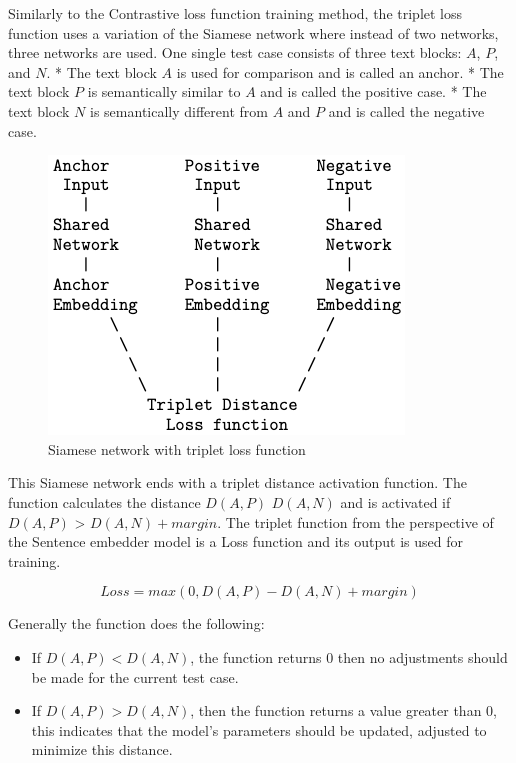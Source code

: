 \documentclass{wseas}
\begin{document}
Similarly to the Contrastive loss function training method, the triplet
loss function uses a variation of the Siamese network where instead of
two networks, three networks are used. One single test case consists of
three text blocks: \(A\), \(P\), and \(N\). * The text block \(A\) is
used for comparison and is called an anchor. * The text block \(P\) is
semantically similar to \(A\) and is called the positive case. * The
text block \(N\) is semantically different from \(A\) and \(P\) and is
called the negative case.


\begin{figure}[htbp]
  \centering
  \includegraphics[width=\linewidth]{resources/v1/tripletLoss.png}
  \caption{Siamese network with triplet loss function}
  \label{fig:triplet_loss_function_figure}
\end{figure}

This Siamese network ends with a triplet distance activation function.
The function calculates the distance \(D(A,P)\) \(D(A,N)\) and is
activated if \(D(A,P)\) \textgreater{} \(D(A,N) + margin\). The
triplet function from the perspective of the Sentence embedder model is
a Loss function and its output is used for training. 

\begin{equation}
  Loss = max(0, D(A,P) - D(A,N) + margin) 
\end{equation}\cite{cite5}

Generally the function does the following:
\begin{itemize}
  \item If \(D(A,P) < D(A,N)\), the function returns 0 then no adjustments should be 
  made for the current test case. 
  \item If \(D(A,P) > D(A,N)\), then the function returns a value greater than 0, this
  indicates that the model's parameters should be updated, adjusted to minimize this distance. 
\end{itemize}
\end{document}
